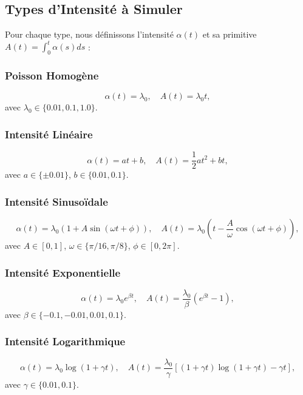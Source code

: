 \documentclass[12pt,a4paper]{article}
\begin{document}
	\subsection{Types d'Intensité à Simuler}
	\label{subsec:types_intensite}
	
	Pour chaque type, nous définissons l'intensité $\alpha(t)$ et sa primitive $A(t) = \int_0^t \alpha(s)ds$ :
	
	\subsubsection{Poisson Homogène}
	\begin{equation}
		\alpha(t) = \lambda_0, \quad A(t) = \lambda_0 t,
	\end{equation}
	avec $\lambda_0 \in \{0.01, 0.1, 1.0\}$.
	
	\subsubsection{Intensité Linéaire}
	\begin{equation}
		\alpha(t) = a t + b, \quad A(t) = \frac{1}{2} a t^2 + b t,
	\end{equation}
	avec $a \in \{\pm 0.01\}$, $b \in \{0.01, 0.1\}$.
	
	\subsubsection{Intensité Sinusoïdale}
	\begin{equation}
		\alpha(t) = \lambda_0 (1 + A \sin(\omega t + \phi)), \quad A(t) = \lambda_0 \left(t - \frac{A}{\omega} \cos(\omega t + \phi)\right),
	\end{equation}
	avec $A \in [0,1]$, $\omega \in \{\pi/16, \pi/8\}$, $\phi \in [0, 2\pi]$.
	
	\subsubsection{Intensité Exponentielle}
	\begin{equation}
		\alpha(t) = \lambda_0 e^{\beta t}, \quad A(t) = \frac{\lambda_0}{\beta} (e^{\beta t} - 1),
	\end{equation}
	avec $\beta \in \{-0.1, -0.01, 0.01, 0.1\}$.
	
	\subsubsection{Intensité Logarithmique}
	\begin{equation}
		\alpha(t) = \lambda_0 \log(1 + \gamma t), \quad A(t) = \frac{\lambda_0}{\gamma} \left[(1+\gamma t)\log(1+\gamma t) - \gamma t\right],
	\end{equation}
	avec $\gamma \in \{0.01, 0.1\}$.
	
\end{document}
